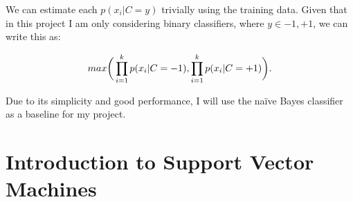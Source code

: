 \documentclass[12pt,a4paper,twoside,openright]{report}
\begin{document}
We can estimate each $p(x_i | C = y)$ trivially using the training data. Given that in this project I am only considering binary classifiers, where $y \in {-1, +1}$, we can write this as:

\begin{equation}
max \bigg( \displaystyle \prod_{i = 1}^{k}p(x_i | C = -1), \prod_{i = 1}^{k}p(x_i | C = +1) \bigg). \\
\end{equation}

Due to its simplicity and good performance, I will use the na\"{i}ve Bayes classifier as a baseline for my project.
\section{Introduction to Support Vector Machines}
\end{document}
